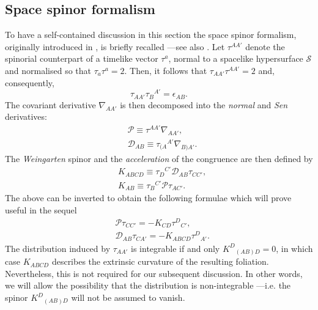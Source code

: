 \documentclass[10pt,a4paper]{article}
\theoremstyle{plain}
\begin{document}
\subsection{Space spinor formalism}\label{Subsec:DecomposedOperators}
\label{SpaceSpinorFormalism}
To have a self-contained discussion in this section the space spinor
formalism, originally introduced in \cite{Som80}, is briefly recalled
---see also \cite{GarVal08c,BaeVal10b,CFEbook}.  Let $\tau^{AA'}$
denote the spinorial counterpart of a timelike vector $\tau^{a}$,
normal to a spacelike hypersurface $\mathcal{S}$ and normalised so
that $\tau_{a}\tau^{a}=2$.  Then, it follows that
$\tau_{AA'}\tau^{AA'}=2$ and, consequently,
\[\tau_{AA'}\tau_B{}^{A'}=\epsilon_{AB}.\]  
The covariant derivative $\nabla_{AA'}$ is then decomposed into the
\emph{normal} and \emph{Sen} derivatives:
\begin{align*}
& \mathcal{P}\equiv \tau^{AA'}\nabla_{AA'},\\ & \mathcal{D}_{AB}\equiv
  \tau_{(A}{}^{A'}\nabla_{B)A'}.
\end{align*}
The \emph{Weingarten} spinor and the \emph{acceleration} of the
congruence are then defined by
\begin{align*}
& K_{ABCD} \equiv \tau_{D}{}^{C'} \mathcal{D}_{AB}\tau_{CC'},\\ &
  K_{AB} \equiv \tau_{B}{}^{C'} \mathcal{P}\tau_{AC'}.
\end{align*}
The above can be inverted to obtain the following formulae which will
prove useful in the sequel
\begin{align*}
& \mathcal{P} \tau_{CC'}=- K_{CD} \tau^{D}{}_{C'},\\ &
  \mathcal{D}_{AB}\tau_{CA'} = - K_{ABCD} \tau^{D}{}_{A'}.
\end{align*}
The distribution induced by $\tau_{AA'}$ is integrable if and only
$K^D{}_{(AB)D}=0$, in which case $K_{ABCD}$ describes the extrinsic
curvature of the resulting foliation.
 Nevertheless, this is not required for our subsequent discussion.
In other words, we will allow
 the possibility that the distribution is non-integrable
---i.e. the spinor $ K^D{}_{(AB)D}$ will not be assumed
to vanish. 

\medskip
\end{document}
